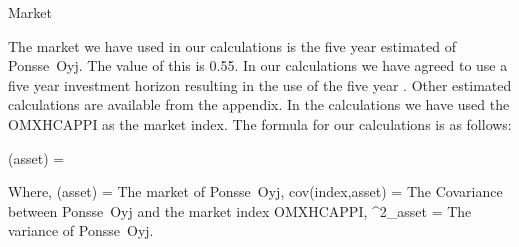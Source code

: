 Market \beta

The market \beta we have used in our calculations is the five year estimated \beta of Ponsse~Oyj. The value of this \beta is 0.55. In our calculations we have agreed to use a five year investment horizon resulting in the use of the five year \beta. Other estimated \beta calculations are available from the appendix. In the calculations we have used the OMXHCAPPI as the market index. The formula for our \beta calculations is as follows:

\beta (asset) = 

Where,
\beta (asset) = The market \beta of Ponsse~Oyj,
cov(index,asset) = The Covariance between Ponsse~Oyj and the market index OMXHCAPPI,
\sigma ^{2}_{asset} = The variance of Ponsse~Oyj.
